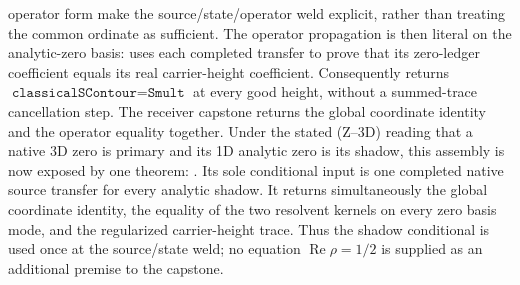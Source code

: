 \documentclass[11pt]{article}
\theoremstyle{definition}
\renewcommand{\Re}{\operatorname{Re}}
\begin{document}
operator form
 make the
source/state/operator weld explicit, rather than treating the common
ordinate as sufficient.
The operator propagation is then literal on the analytic-zero basis:
uses each completed transfer to prove that its zero-ledger coefficient equals
its real carrier-height coefficient.  Consequently
 returns
\(\texttt{classicalSContour}=\texttt{Smult}\) at every good height, without a
summed-trace cancellation step.  The receiver capstone
returns the global coordinate identity and the operator equality together.
Under the stated (Z--3D) reading that a native 3D zero is primary and its 1D
analytic zero is its shadow, this assembly is now exposed by one theorem:
.
Its sole conditional input is one completed native source transfer for every
analytic shadow.  It returns simultaneously the global coordinate identity,
the equality of the two resolvent kernels on every zero basis mode, and the
regularized carrier-height trace.  Thus the shadow conditional is used once
at the source/state weld; no equation \(\Re\rho=1/2\) is supplied as an
additional premise to the capstone.
\end{document}

